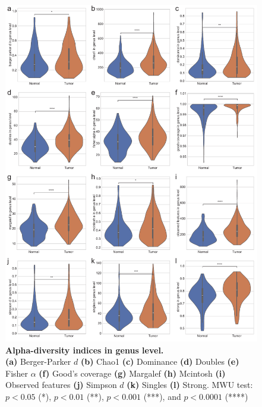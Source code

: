 \documentclass[11pt, a4paper, onecolumn, oneside]{report}
\begin{document}
            \begin{figure}[p]
                \centering
                \includegraphics[width=\linewidth]{Figures/CRC/Figure_02.pdf}
                \caption[Alpha-diversity indices in genus level]{\textbf{Alpha-diversity indices in genus level.}\\
                    \textbf{(a)} Berger-Parker $d$ \textbf{(b)} Chao1 \textbf{(c)} Dominance \textbf{(d)} Doubles \textbf{(e)} Fisher $\alpha$ \textbf{(f)} Good's coverage \textbf{(g)} Margalef \textbf{(h)} Mcintosh \textbf{(i)} Observed features \textbf{(j)} Simpson $d$ \textbf{(k)} Singles \textbf{(l)} Strong. MWU test: $p < 0.05$ (*), $p < 0.01$ (**), $p < 0.001$ (***), and $p < 0.0001$ (****)}
                \label{fig:CRC-alpha}
            \end{figure}
            \clearpage
\end{document}
